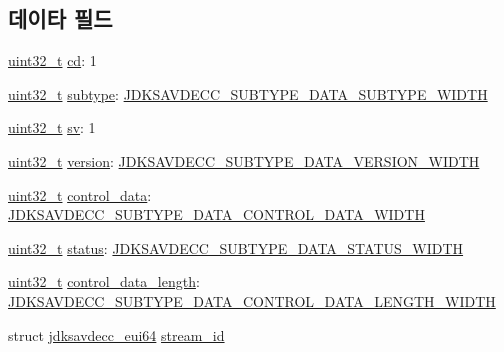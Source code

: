 \subsection*{데이타 필드}
\begin{DoxyCompactItemize}
\item 
\hyperlink{parse_8c_a6eb1e68cc391dd753bc8ce896dbb8315}{uint32\+\_\+t} \hyperlink{structjdksavdecc__common__control__header_a9bdcd90bda4a8763700a1d59c27a6a26}{cd}\+: 1
\item 
\hyperlink{parse_8c_a6eb1e68cc391dd753bc8ce896dbb8315}{uint32\+\_\+t} \hyperlink{structjdksavdecc__common__control__header_aed06f4a516930ca81d204d53c61a1ef3}{subtype}\+: \hyperlink{group__jdksavdecc__subtype__data_ga624227fd72dbec4cbec4f6436024fad8}{J\+D\+K\+S\+A\+V\+D\+E\+C\+C\+\_\+\+S\+U\+B\+T\+Y\+P\+E\+\_\+\+D\+A\+T\+A\+\_\+\+S\+U\+B\+T\+Y\+P\+E\+\_\+\+W\+I\+D\+TH}
\item 
\hyperlink{parse_8c_a6eb1e68cc391dd753bc8ce896dbb8315}{uint32\+\_\+t} \hyperlink{structjdksavdecc__common__control__header_a9eeedef9f348218323834a3cf44d64c4}{sv}\+: 1
\item 
\hyperlink{parse_8c_a6eb1e68cc391dd753bc8ce896dbb8315}{uint32\+\_\+t} \hyperlink{structjdksavdecc__common__control__header_acd99bb05ca015e7d74448acb1deba7ca}{version}\+: \hyperlink{group__jdksavdecc__subtype__data_ga97591e640a971dc293e1416455fb9ee3}{J\+D\+K\+S\+A\+V\+D\+E\+C\+C\+\_\+\+S\+U\+B\+T\+Y\+P\+E\+\_\+\+D\+A\+T\+A\+\_\+\+V\+E\+R\+S\+I\+O\+N\+\_\+\+W\+I\+D\+TH}
\item 
\hyperlink{parse_8c_a6eb1e68cc391dd753bc8ce896dbb8315}{uint32\+\_\+t} \hyperlink{structjdksavdecc__common__control__header_abeb7687707d27fbbaf09447428542db9}{control\+\_\+data}\+: \hyperlink{group__jdksavdecc__subtype__data_ga032f46118325ac56a0505490dff24963}{J\+D\+K\+S\+A\+V\+D\+E\+C\+C\+\_\+\+S\+U\+B\+T\+Y\+P\+E\+\_\+\+D\+A\+T\+A\+\_\+\+C\+O\+N\+T\+R\+O\+L\+\_\+\+D\+A\+T\+A\+\_\+\+W\+I\+D\+TH}
\item 
\hyperlink{parse_8c_a6eb1e68cc391dd753bc8ce896dbb8315}{uint32\+\_\+t} \hyperlink{structjdksavdecc__common__control__header_ade20423e91627f07e610924cb0081623}{status}\+: \hyperlink{group__jdksavdecc__subtype__data_ga38a112978fe469b74b7541de23733f50}{J\+D\+K\+S\+A\+V\+D\+E\+C\+C\+\_\+\+S\+U\+B\+T\+Y\+P\+E\+\_\+\+D\+A\+T\+A\+\_\+\+S\+T\+A\+T\+U\+S\+\_\+\+W\+I\+D\+TH}
\item 
\hyperlink{parse_8c_a6eb1e68cc391dd753bc8ce896dbb8315}{uint32\+\_\+t} \hyperlink{structjdksavdecc__common__control__header_ae87a102016a7b6abd96bba5df2ae3768}{control\+\_\+data\+\_\+length}\+: \hyperlink{group__jdksavdecc__subtype__data_ga0bd033997c197fad16adfd5e24708935}{J\+D\+K\+S\+A\+V\+D\+E\+C\+C\+\_\+\+S\+U\+B\+T\+Y\+P\+E\+\_\+\+D\+A\+T\+A\+\_\+\+C\+O\+N\+T\+R\+O\+L\+\_\+\+D\+A\+T\+A\+\_\+\+L\+E\+N\+G\+T\+H\+\_\+\+W\+I\+D\+TH}
\item 
struct \hyperlink{structjdksavdecc__eui64}{jdksavdecc\+\_\+eui64} \hyperlink{structjdksavdecc__common__control__header_af4c017686a11885d1d514c21bcde8160}{stream\+\_\+id}
\end{DoxyCompactItemize}


